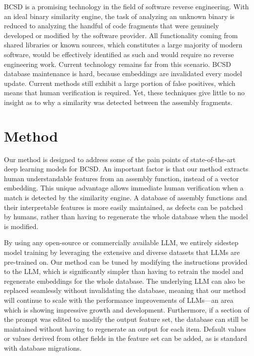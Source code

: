 BCSD is a promising technology in the field of software reverse engineering. With an ideal binary similarity engine,
the task of analyzing an unknown binary is reduced to analyzing the handful of code fragments that were genuinely developed
or modified by the software provider. All functionality coming from shared libraries or known sources, which constitutes a
large majority of modern software, would be effectively identified as such and would require no reverse engineering work.
Current technology remains far from this scenario. BCSD database maintenance is hard, because embeddings are invalidated
every model update. Current methods still exhibit a large portion of false positives, which means that human verification
is required. Yet, these techniques give little to no insight as to why a similarity was detected between the assembly fragments.

\section{Method}

Our method is designed to address some of the pain points of state-of-the-art deep learning models for BCSD.
An important factor is that our method extracts human understandable features from an assembly function, instead
of a vector embedding. This unique advantage allows immediate human verification when a match is detected by the similarity
engine. A database of assembly functions and their interpretable features is more easily maintained, as defects can
be patched by humans, rather than having to regenerate the whole database when the model is modified.

By using any open-source or commercially available LLM, we entirely sidestep model training by leveraging the extensive
and diverse datasets that LLMs are pre-trained on. Our method can be tuned by modifying the instructions provided to
the LLM, which is significantly simpler than having to retrain the model and regenerate embeddings for the whole database.
The underlying LLM can also be replaced seamlessly without invalidating the database, meaning that our method will continue
to scale with the performance improvements of LLMs---an area which is showing impressive growth and development. Furthermore, if
a section of the prompt was edited to modify the output feature set, the database can still be maintained without
having to regenerate an output for each item. Default values or values derived from other fields in the feature set can be added,
as is standard with database migrations.

